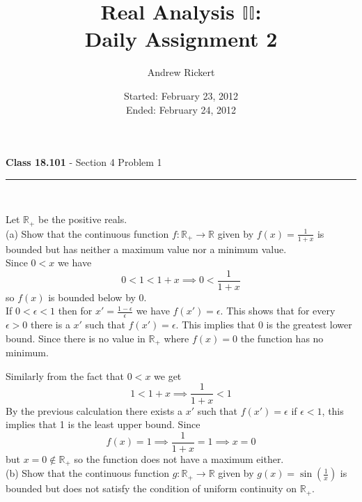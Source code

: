 \documentclass[11pt,reqno]{article}
\title{Real Analysis $\mathbb{II}$: \\ Daily Assignment 2}
\author{Andrew Rickert}
\date{Started: February 23, 2012 \\ \hspace{1pt} Ended: February 24,  2012}                                           %
\begin{document}
\maketitle


\begin{flushleft} 
\textbf{Class 18.101} - Section 4 Problem 1\\
\rule{500pt}{1pt}\\
\end{flushleft} 

\noindent Let $\mathbb{R}_+$ be the positive reals.\\
(a) Show that the continuous function $f : \mathbb{R}_+ \to \mathbb{R}$ given by $f(x) = \frac{1}{1+x}$ is bounded but has neither a maximum value nor a minimum value.\\

\noindent Since $0 < x$ we have 
\[0 < 1 < 1 + x \implies 0 < \frac{1}{1+x}\] 
so $f(x)$ is bounded below by 0. \\

If $0 < \epsilon < 1$ then for $x' = \frac{1-\epsilon}{\epsilon}$ we have $f(x') = \epsilon$. This shows that for every $\epsilon > 0$ there is a $x'$ such that $f(x') = \epsilon$. This implies that 0 is the greatest lower bound. Since there is no value in $\mathbb{R}_+$ where $f(x) = 0$ the function has no minimum.

Similarly from the fact that $0 < x$ we get 
\[1 < 1 + x \implies \frac{1}{1+x} < 1\] 
By the previous calculation there exists a $x'$ such that $f(x') = \epsilon$ if $\epsilon < 1$, this implies that 1 is the least upper bound. Since
\[ f(x) = 1 \implies \frac{1}{1+x} = 1 \implies x = 0 \]
but $x = 0 \notin \mathbb{R}_+$ so the function does not have a maximum either.\\

\noindent (b) Show that the continuous function $g : \mathbb{R}_+ \to \mathbb{R}$ given by $g(x) = \sin (\frac{1}{x})$ is bounded but does not satisfy the condition of uniform continuity on $\mathbb{R}_+$.\\
\end{document}

